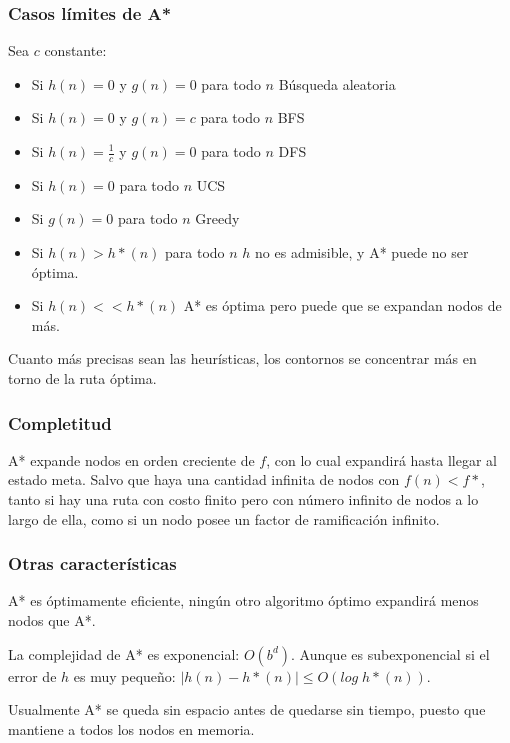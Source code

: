 \subsubsection{Casos límites de A*}
Sea $c$ constante:
\begin{itemize}
\item Si $h(n) = 0$ y $g(n) = 0$ para todo $n$ \longrightarrow Búsqueda aleatoria
\item Si $h(n) = 0$ y $g(n) = c$ para todo $n$ \longrightarrow BFS
\item Si $h(n) = \frac{1}{c}$ y $g(n) = 0$ para todo $n$ \longrightarrow DFS
\item Si $h(n) = 0$ para todo $n$ \longrightarrow UCS
\item Si $g(n) = 0$ para todo $n$ \longrightarrow Greedy
\item Si $h(n) > h*(n)$ para todo $n$ \longrightarrow $h$ no es admisible, y A*
    puede no ser óptima.
\item Si $h(n) << h*(n)$ \longrightarrow A* es óptima pero puede que se expandan
    nodos de más.
\end{itemize}

Cuanto más precisas sean las heurísticas, los contornos se concentrar más en torno
de la ruta óptima.

\subsubsection{Completitud}
A* expande nodos en orden creciente de $f$, con lo cual expandirá hasta llegar al
estado meta. Salvo que haya una cantidad infinita de nodos con $f(n) < f*$, tanto
si hay una ruta con costo finito pero con número infinito de nodos a lo largo de
ella, como si un nodo posee un factor de ramificación infinito.

\subsubsection{Otras características}
A* es óptimamente eficiente, ningún otro algoritmo óptimo expandirá menos nodos
que A*.

La complejidad de A* es exponencial: $O(b^d)$. Aunque es subexponencial si el
error de $h$ es muy pequeño: $| h(n) - h*(n) | \leq O(log\; h*(n))$.

Usualmente A* se queda sin espacio antes de quedarse sin tiempo, puesto que
mantiene a todos los nodos en memoria.

